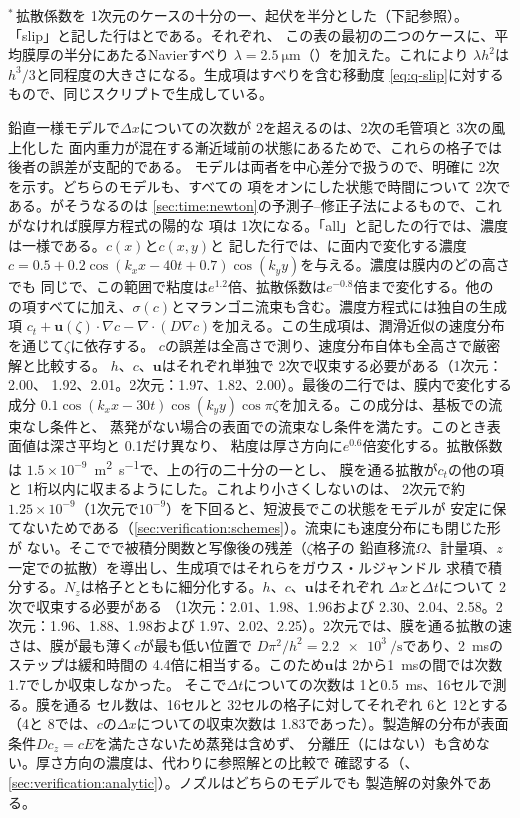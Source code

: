 \noindent$^{*}$\,拡散係数を 1次元のケースの十分の一、起伏を半分とした（下記参照）。
「slip」と記した行はとである。それぞれ、
この表の最初の二つのケースに、平均膜厚の半分にあたるNavierすべり
$\lambda = \SI{2.5}{\micro\metre}$（）を加えた。これにより
$\lambda h^2$は$h^3/3$と同程度の大きさになる。生成項はすべりを含む移動度
\cref{eq:q-slip}に対するもので、同じスクリプトで生成している。

鉛直一様モデルで$\Delta x$についての次数が 2を超えるのは、2次の毛管項と 3次の風上化した
面内重力が混在する漸近域前の状態にあるためで、これらの格子では後者の誤差が支配的である。
モデルは両者を中心差分で扱うので、明確に 2次を示す。どちらのモデルも、すべての
項をオンにした状態で時間について 2次である。がそうなるのは
\cref{sec:time:newton}の予測子--修正子法によるもので、これがなければ膜厚方程式の陽的な
項は 1次になる。「all」と記したの行では、濃度は一様である。$c(x)$と$c(x,y)$と
記した行では、に面内で変化する濃度
$c = 0.5 + 0.2\cos(k_x x - 40t + 0.7)\cos(k_y y)$を与える。濃度は膜内のどの高さでも
同じで、この範囲で粘度は$e^{1.2}$倍、拡散係数は$e^{-0.8}$倍まで変化する。他の
の項すべてに加え、$\sigma(c)$とマランゴニ流束も含む。濃度方程式には独自の生成項
$c_t + \mathbf{u}(\zeta)\cdot\nabla c -
\nabla\cdot(D\nabla c)$を加える。この生成項は、潤滑近似の速度分布を通じて$\zeta$に依存する。
$c$の誤差は全高さで測り、速度分布自体も全高さで厳密解と比較する。
$h$、$c$、$\mathbf{u}$はそれぞれ単独で 2次で収束する必要がある（1次元：2.00、
1.92、2.01。2次元：1.97、1.82、2.00）。最後の二行では、膜内で変化する成分
$0.1\cos(k_x x-30t)\cos(k_y y)\cos\pi\zeta$を加える。この成分は、基板での流束なし条件と、
蒸発がない場合の表面での流束なし条件を満たす。このとき表面値は深さ平均と 0.1だけ異なり、
粘度は厚さ方向に$e^{0.6}$倍変化する。拡散係数は
$1.5\times10^{-9}$~\si{\metre\squared\per\second}で、上の行の二十分の一とし、
膜を通る拡散が$c_t$の他の項と 1桁以内に収まるようにした。これより小さくしないのは、
2次元で約$1.25\times10^{-9}$（1次元で$10^{-9}$）を下回ると、短波長でこの状態をモデルが
安定に保てないためである（\cref{sec:verification:schemes}）。流束にも速度分布にも閉じた形が
ない。そこでで被積分関数と写像後の残差（$\zeta$格子の
鉛直移流$\Omega$、計量項、$z$一定での拡散）を導出し、生成項ではそれらをガウス・ルジャンドル
求積で積分する。$N_z$は格子とともに細分化する。$h$、$c$、$\mathbf u$はそれぞれ
$\Delta x$と$\Delta t$について 2次で収束する必要がある
（1次元：2.01、1.98、1.96および 2.30、2.04、2.58。2次元：1.96、1.88、1.98および
1.97、2.02、2.25）。2次元では、膜を通る拡散の速さは、膜が最も薄く$c$が最も低い位置で
$D\pi^2/h^2 = \SI{2.2e3}{\per\second}$であり、\SI{2}{\milli\second}のステップは緩和時間の
4.4倍に相当する。このため$\mathbf u$は 2から\SI{1}{\milli\second}の間では次数 1.7でしか収束しなかった。
そこで$\Delta t$についての次数は 1と\SI{0.5}{\milli\second}、16セルで測る。膜を通る
セル数は、16セルと 32セルの格子に対してそれぞれ 6と 12とする（4と 8では、$c$の$\Delta x$についての収束次数は
1.83であった）。製造解の分布が表面条件$D c_z = cE$を満たさないため蒸発は含めず、
分離圧（にはない）も含めない。厚さ方向の濃度は、代わりに参照解との比較で
確認する（、\cref{sec:verification:analytic}）。ノズルはどちらのモデルでも
製造解の対象外である。

